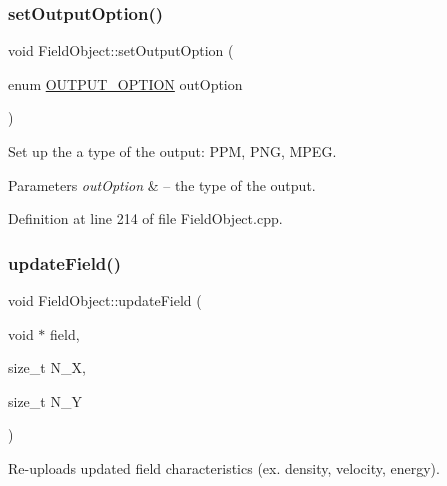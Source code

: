 \mbox{\label{class_field_object_af3ad1cf11c7033def6ea707dc39bf3dd}} 
\subsubsection{\texorpdfstring{set\+Output\+Option()}{setOutputOption()}}
{\footnotesize\ttfamily void Field\+Object\+::set\+Output\+Option (\begin{DoxyParamCaption}\item[{enum \hyperlink{offscreen_8h_a29ac838d689ab5ed87b591138936e615}{O\+U\+T\+P\+U\+T\+\_\+\+O\+P\+T\+I\+ON}}]{out\+Option }\end{DoxyParamCaption})}



Set up the a type of the output\+: P\+PM, P\+NG, M\+P\+EG. 


\begin{DoxyParams}{Parameters}
{\em out\+Option} & -- the type of the output. \\
\hline
\end{DoxyParams}


Definition at line 214 of file Field\+Object.\+cpp.

\mbox{\label{class_field_object_ae44fb6a929a1a14815f8c9757c75bdf1}} 
\subsubsection{\texorpdfstring{update\+Field()}{updateField()}}
{\footnotesize\ttfamily void Field\+Object\+::update\+Field (\begin{DoxyParamCaption}\item[{void $\ast$}]{field,  }\item[{size\+\_\+t}]{N\+\_\+X,  }\item[{size\+\_\+t}]{N\+\_\+Y }\end{DoxyParamCaption})\hspace{0.3cm}{\ttfamily [protected]}}



Re-\/uploads updated field characteristics (ex. density, velocity, energy). 



